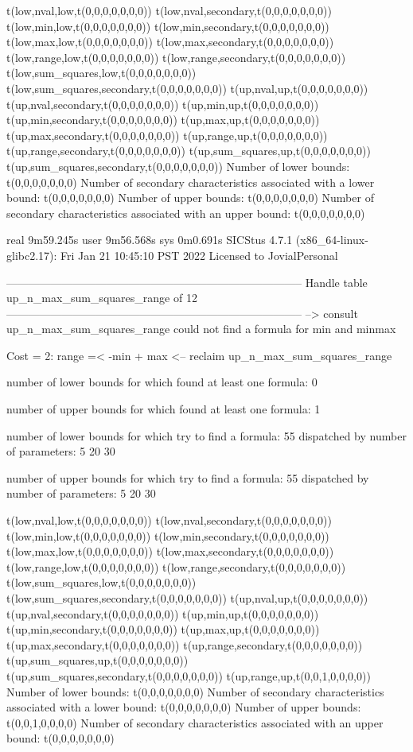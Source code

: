 t(low,nval,low,t(0,0,0,0,0,0,0))
t(low,nval,secondary,t(0,0,0,0,0,0,0))
t(low,min,low,t(0,0,0,0,0,0,0))
t(low,min,secondary,t(0,0,0,0,0,0,0))
t(low,max,low,t(0,0,0,0,0,0,0))
t(low,max,secondary,t(0,0,0,0,0,0,0))
t(low,range,low,t(0,0,0,0,0,0,0))
t(low,range,secondary,t(0,0,0,0,0,0,0))
t(low,sum_squares,low,t(0,0,0,0,0,0,0))
t(low,sum_squares,secondary,t(0,0,0,0,0,0,0))
t(up,nval,up,t(0,0,0,0,0,0,0))
t(up,nval,secondary,t(0,0,0,0,0,0,0))
t(up,min,up,t(0,0,0,0,0,0,0))
t(up,min,secondary,t(0,0,0,0,0,0,0))
t(up,max,up,t(0,0,0,0,0,0,0))
t(up,max,secondary,t(0,0,0,0,0,0,0))
t(up,range,up,t(0,0,0,0,0,0,0))
t(up,range,secondary,t(0,0,0,0,0,0,0))
t(up,sum_squares,up,t(0,0,0,0,0,0,0))
t(up,sum_squares,secondary,t(0,0,0,0,0,0,0))
Number of lower bounds:                                             t(0,0,0,0,0,0,0)
Number of secondary characteristics associated with a lower bound:  t(0,0,0,0,0,0,0)
Number of upper bounds:                                             t(0,0,0,0,0,0,0)
Number of secondary characteristics associated with an upper bound: t(0,0,0,0,0,0,0)

real	9m59.245s
user	9m56.568s
sys	0m0.691s
SICStus 4.7.1 (x86_64-linux-glibc2.17): Fri Jan 21 10:45:10 PST 2022
Licensed to JovialPersonal


--------------------------------------------------------------------------------
Handle table up_n_max_sum_squares_range of 12
--------------------------------------------------------------------------------
--> consult up_n_max_sum_squares_range
could not find a formula for min and minmax

Cost =  2:  range =< -min + max
<-- reclaim up_n_max_sum_squares_range

number of lower bounds for which found at least one formula: 0

number of upper bounds for which found at least one formula: 1

number of lower bounds for which try to find a formula: 55
dispatched by number of parameters: 5  20  30

number of upper bounds for which try to find a formula: 55
dispatched by number of parameters: 5  20  30

t(low,nval,low,t(0,0,0,0,0,0,0))
t(low,nval,secondary,t(0,0,0,0,0,0,0))
t(low,min,low,t(0,0,0,0,0,0,0))
t(low,min,secondary,t(0,0,0,0,0,0,0))
t(low,max,low,t(0,0,0,0,0,0,0))
t(low,max,secondary,t(0,0,0,0,0,0,0))
t(low,range,low,t(0,0,0,0,0,0,0))
t(low,range,secondary,t(0,0,0,0,0,0,0))
t(low,sum_squares,low,t(0,0,0,0,0,0,0))
t(low,sum_squares,secondary,t(0,0,0,0,0,0,0))
t(up,nval,up,t(0,0,0,0,0,0,0))
t(up,nval,secondary,t(0,0,0,0,0,0,0))
t(up,min,up,t(0,0,0,0,0,0,0))
t(up,min,secondary,t(0,0,0,0,0,0,0))
t(up,max,up,t(0,0,0,0,0,0,0))
t(up,max,secondary,t(0,0,0,0,0,0,0))
t(up,range,secondary,t(0,0,0,0,0,0,0))
t(up,sum_squares,up,t(0,0,0,0,0,0,0))
t(up,sum_squares,secondary,t(0,0,0,0,0,0,0))
t(up,range,up,t(0,0,1,0,0,0,0))
Number of lower bounds:                                             t(0,0,0,0,0,0,0)
Number of secondary characteristics associated with a lower bound:  t(0,0,0,0,0,0,0)
Number of upper bounds:                                             t(0,0,1,0,0,0,0)
Number of secondary characteristics associated with an upper bound: t(0,0,0,0,0,0,0)

